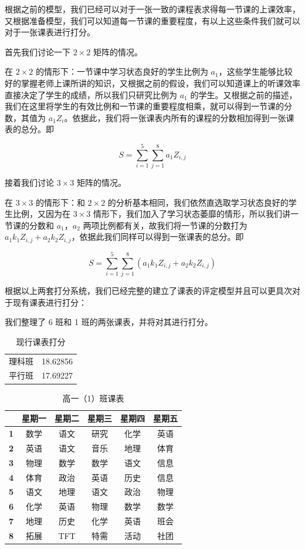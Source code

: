 \documentclass[a4paper]{article}
\begin{document}
 根据之前的模型，我们已经可以对于一张一致的课程表求得每一节课的上课效率，又根据准备模型，我们可以知道每一节课的重要程度，有以上这些条件我们就可以对于一张课表进行打分。

 首先我们讨论一下 $2\times2$ 矩阵的情况。

 在 $2\times2$ 的情形下：一节课中学习状态良好的学生比例为 $a_1$，这些学生能够比较好的掌握老师上课所讲的知识，又根据之前的假设，我们可以知道课上的听课效率直接决定了学生的成绩，所以我们只研究比例为 $a_1$ 的学生。又根据之前的描述，我们在这里将学生的有效比例和一节课的重要程度相乘，就可以得到一节课的分数，其值为 $a_1Z_i$。依据此，我们将一张课表内所有的课程的分数相加得到一张课表的总分。即

 \begin{equation}
 S=\sum_{i=1}^5\sum_{j=1}^8a_1Z_{i,j}
 \end{equation}

 接着我们讨论 $3\times3$ 矩阵的情况。

 在 $3\times3$ 的情形下：和 $2\times2$ 的分析基本相同，我们依然直选取学习状态良好的学生比例，又因为在 $3\times3$ 情形下，我们加入了学习状态萎靡的情形，所以我们讲一节课的分数和 $a_1$，$a_2$ 两项比例都有关，故我们将一节课的分数打为 $a_1k_1Z_{i,j}+a_2k_2Z_{i,j}$，依据此我们同样可以得到一张课表的总分。即

 \begin{equation}
 S=\sum_{i=1}^5\sum_{j=1}^8\left(a_1k_1Z_{i,j}+a_2k_2Z_{i,j}\right)
 \end{equation}

 根据以上两套打分系统，我们已经完整的建立了课表的评定模型并且可以更具次对于现有课表进行打分：

 我们整理了 6 班和 1 班的两张课表，并将对其进行打分。

 \begin{table}[H]
 \centering
 \begin{tabular}{cc}
 \toprule
 理科班 & 18.62856 \\
 平行班 & 17.69227 \\
 \bottomrule
 \end{tabular}
 \caption{现行课表打分}
 \end{table}

 \begin{table}[H]
 \centering
 \begin{tabular}{cccccc}
 \toprule
 & \bf 星期一 & \bf 星期二 & \bf 星期三 & \bf 星期四 & \bf 星期五 \\
 \midrule
 \bf 1 & 数学 & 语文 & 研究 & 化学 & 英语 \\
 \bf 2 & 英语 & 语文 & 音乐 & 地理 & 体育 \\
 \bf 3 & 物理 & 数学 & 数学 & 语文 & 信息 \\
 \bf 4 & 体育 & 政治 & 英语 & 历史 & 信息 \\
 \midrule
 \bf 5 & 语文 & 地理 & 语文 & 政治 & 物理 \\
 \bf 6 & 化学 & 英语 & 物理 & 数学 & 数学 \\
 \bf 7 & 地理 & 历史 & 化学 & 英语 & 班会 \\
 \bf 8 & 拓展 & TFT  & 特需 & 活动 & 社团 \\
 \bottomrule
 \end{tabular}
 \caption{高一（1）班课表}
 \end{table}
\end{document}
